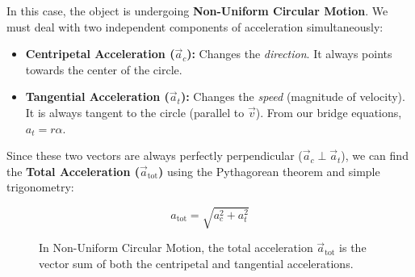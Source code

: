 \documentclass{article}
\begin{document}
In this case, the object is undergoing \textbf{Non-Uniform Circular Motion}. We must deal with two independent components of acceleration simultaneously:
\begin{itemize}
    \item \textbf{Centripetal Acceleration ($\vec{a}_c$):} Changes the \emph{direction}. It always points towards the center of the circle.
    \item \textbf{Tangential Acceleration ($\vec{a}_t$):} Changes the \emph{speed} (magnitude of velocity). It is always tangent to the circle (parallel to $\vec{v}$). From our bridge equations, $a_t = r\alpha$.
\end{itemize}

Since these two vectors are always perfectly perpendicular ($\vec{a}_c \perp \vec{a}_t$), we can find the \textbf{Total Acceleration ($\vec{a}_{\text{tot}}$)} using the Pythagorean theorem and simple trigonometry:

\begin{equation}
    a_{\text{tot}} = \sqrt{a_c^2 + a_t^2}
\end{equation}

\vspace{0.5cm}

\begin{figure}[h]
    \centering
    \caption{In Non-Uniform Circular Motion, the total acceleration $\vec{a}_{\text{tot}}$ is the vector sum of both the centripetal and tangential accelerations.}
\end{figure}
\end{document}
